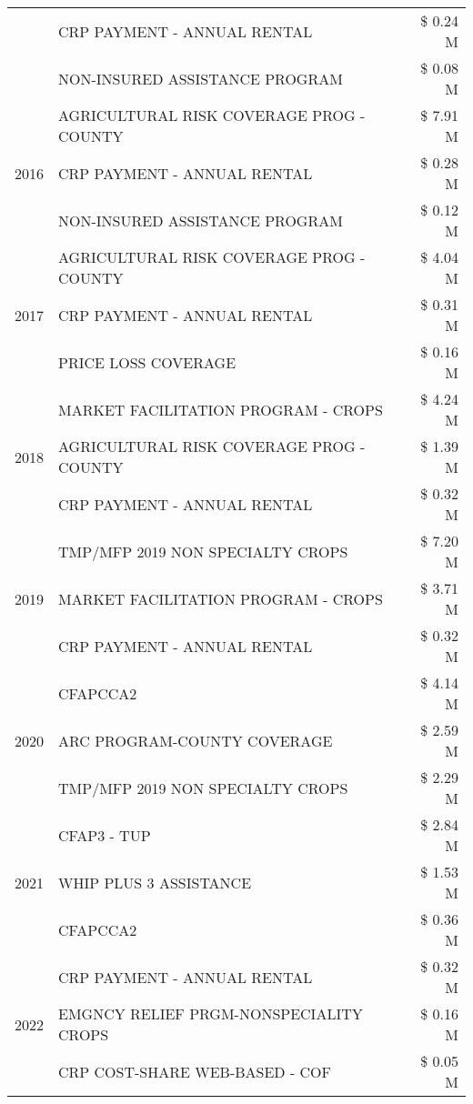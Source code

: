 \begin{tabular}{llr}
 & CRP PAYMENT - ANNUAL RENTAL & \$ 0.24 M \\
 & NON-INSURED ASSISTANCE PROGRAM & \$ 0.08 M \\
\cline{1-3}
\multirow[t]{3}{*}{2016} & AGRICULTURAL RISK COVERAGE PROG - COUNTY & \$ 7.91 M \\
 & CRP PAYMENT - ANNUAL RENTAL & \$ 0.28 M \\
 & NON-INSURED ASSISTANCE PROGRAM & \$ 0.12 M \\
\cline{1-3}
\multirow[t]{3}{*}{2017} & AGRICULTURAL RISK COVERAGE PROG - COUNTY & \$ 4.04 M \\
 & CRP PAYMENT - ANNUAL RENTAL & \$ 0.31 M \\
 & PRICE LOSS COVERAGE & \$ 0.16 M \\
\cline{1-3}
\multirow[t]{3}{*}{2018} & MARKET FACILITATION PROGRAM - CROPS & \$ 4.24 M \\
 & AGRICULTURAL RISK COVERAGE PROG - COUNTY & \$ 1.39 M \\
 & CRP PAYMENT - ANNUAL RENTAL & \$ 0.32 M \\
\cline{1-3}
\multirow[t]{3}{*}{2019} & TMP/MFP 2019 NON SPECIALTY CROPS & \$ 7.20 M \\
 & MARKET FACILITATION PROGRAM - CROPS & \$ 3.71 M \\
 & CRP PAYMENT - ANNUAL RENTAL & \$ 0.32 M \\
\cline{1-3}
\multirow[t]{3}{*}{2020} & CFAPCCA2 & \$ 4.14 M \\
 & ARC PROGRAM-COUNTY COVERAGE & \$ 2.59 M \\
 & TMP/MFP 2019 NON SPECIALTY CROPS & \$ 2.29 M \\
\cline{1-3}
\multirow[t]{3}{*}{2021} & CFAP3 - TUP & \$ 2.84 M \\
 & WHIP PLUS 3 ASSISTANCE & \$ 1.53 M \\
 & CFAPCCA2 & \$ 0.36 M \\
\cline{1-3}
\multirow[t]{3}{*}{2022} & CRP PAYMENT - ANNUAL RENTAL & \$ 0.32 M \\
 & EMGNCY RELIEF PRGM-NONSPECIALITY CROPS & \$ 0.16 M \\
 & CRP COST-SHARE WEB-BASED - COF & \$ 0.05 M \\
\cline{1-3}
\bottomrule
\end{tabular}
